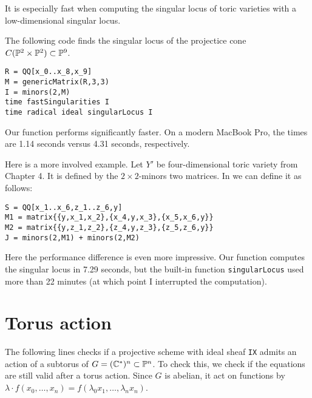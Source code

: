 It is especially fast when computing the singular locus of toric varieties with a low-dimensional singular locus.

The following code finds the singular locus of the projectice cone $C(\P^2 \times \P^2) \subset \P^9$.

\begin{lstlisting}[language=Macaulay2]
R = QQ[x_0..x_8,x_9]
M = genericMatrix(R,3,3)
I = minors(2,M)
time fastSingularities I
time radical ideal singularLocus I
\end{lstlisting}

Our function performs significantly faster. On a modern MacBook Pro, the times are 1.14 seconds versus 4.31 seconds, respectively.

Here is a more involved example. Let $Y'$ be four-dimensional toric variety from Chapter 4. It is defined by the $2 \times 2$-minors two matrices. In \MM we can define it as follows:
\begin{lstlisting}[language=Macaulay2]
S = QQ[x_1..x_6,z_1..z_6,y]
M1 = matrix{{y,x_1,x_2},{x_4,y,x_3},{x_5,x_6,y}}
M2 = matrix{{y,z_1,z_2},{z_4,y,z_3},{z_5,z_6,y}}
J = minors(2,M1) + minors(2,M2)
\end{lstlisting}

Here the performance difference is even more impressive. Our function computes the singular locus in 7.29 seconds, but the built-in function \texttt{singularLocus} used more than 22 minutes (at which point I interrupted the computation).

\section{Torus action}

The following lines checks if a projective scheme with ideal sheaf \texttt{IX} admits an action of a subtorus of $G=(\C^\ast)^n \subset \P^n$. To check this, we check if the equations are still valid after a torus action. Since $G$ is abelian, it act on functions by $\lambda \cdot f(x_0,\ldots,x_n)=f(\lambda_0 x_1, \ldots, \lambda_n x_n)$. 


